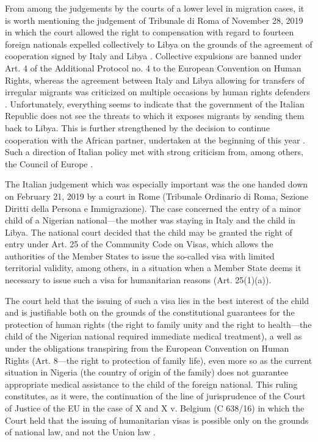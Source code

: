\documentclass[10pt,a4paper]{article}
\begin{document}
\begin{multicols}{2}
From among the judgements by the courts of a lower level in migration cases, it is worth mentioning the judgement of Tribunale di Roma of November 28, 2019 in which the court allowed the right to compensation with regard to fourteen foreign nationals expelled collectively to Libya on the grounds of the agreement of cooperation signed by Italy and Libya \citep{R76}. Collective expulsions are banned under Art. 4 of the Additional Protocol no. 4 to the European Convention on Human Rights, whereas the agreement between Italy and Libya allowing for transfers of irregular migrants was criticized on multiple occasions by human rights defenders \citep{R77}. Unfortunately, everything seems to indicate that the government of the Italian Republic does not see the threats to which it exposes migrants by sending them back to Libya. This is further strengthened by the decision to continue cooperation with the African partner, undertaken at the beginning of this year \citep{R78}. Such a direction of Italian policy met with strong criticism from, among others, the Council of Europe \citep{R79}.

The Italian judgement which was especially important was the one handed down on February 21, 2019 by a court in Rome (Tribunale Ordinario di Roma, Sezione Diritti della Persona e Immigrazione). The case concerned the entry of a minor child of a Nigerian national---the mother was staying in Italy and the child in Libya. The national court decided that the child may be granted the right of entry under Art. 25 of the Community Code on Visas, which allows the authorities of the Member States to issue the so-called visa with limited territorial validity, among others, in a situation when a Member State deems it necessary to issue such a visa for humanitarian reasons (Art. 25(1)(a)).

The court held that the issuing of such a visa lies in the best interest of the child and is justifiable both on the grounds of the constitutional guarantees for the protection of human rights (the right to family unity and the right to health---the child of the Nigerian national required immediate medical treatment), a well as under the obligations transpiring from the European Convention on Human Rights (Art. 8---the right to protection of family life), even more so as the current situation in Nigeria (the country of origin of the family) does not guarantee appropriate medical assistance to the child of the foreign national. This ruling constitutes, as it were, the continuation of the line of jurisprudence of the Court of Justice of the EU in the case of X and X v. Belgium (C 638/16) in which the Court held that the issuing of humanitarian visas is possible only on the grounds of national law, and not the Union law \citep{R80}.


\end{multicols}
\end{document}
